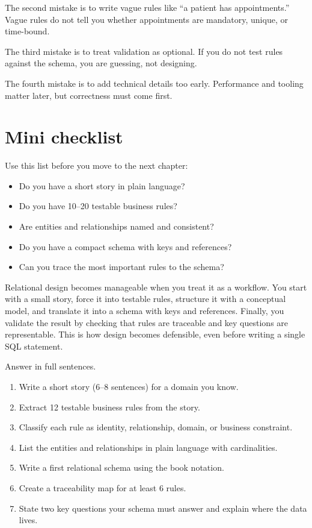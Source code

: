 The second mistake is to write vague rules like “a patient has appointments.”
Vague rules do not tell you whether appointments are mandatory, unique, or time-bound.

The third mistake is to treat validation as optional.
If you do not test rules against the schema, you are guessing, not designing.

The fourth mistake is to add technical details too early.
Performance and tooling matter later, but correctness must come first.

\section{Mini checklist}
Use this list before you move to the next chapter:
\begin{itemize}[leftmargin=*,nosep]
  \item Do you have a short story in plain language?
  \item Do you have 10--20 testable business rules?
  \item Are entities and relationships named and consistent?
  \item Do you have a compact schema with keys and references?
  \item Can you trace the most important rules to the schema?
\end{itemize}

\begin{chaptersummary}
Relational design becomes manageable when you treat it as a workflow.
You start with a small story, force it into testable rules, structure it with a conceptual model, and translate it into a schema with keys and references.
Finally, you validate the result by checking that rules are traceable and key questions are representable.
This is how design becomes defensible, even before writing a single SQL statement.
\end{chaptersummary}

\begin{exercisebox}
Answer in full sentences.
\begin{enumerate}[label=\arabic*.]
  \item Write a short story (6--8 sentences) for a domain you know.
  \item Extract 12 testable business rules from the story.
  \item Classify each rule as identity, relationship, domain, or business constraint.
  \item List the entities and relationships in plain language with cardinalities.
  \item Write a first relational schema using the book notation.
  \item Create a traceability map for at least 6 rules.
  \item State two key questions your schema must answer and explain where the data lives.
\end{enumerate}
\end{exercisebox}

